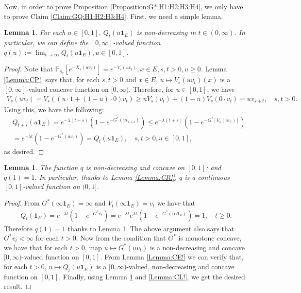 \documentclass[12pt,a4paper]{amsart}
\numberwithin{equation}{section}
\theoremstyle{plain}
\newtheorem{lem}[thm]{Lemma}
\theoremstyle{definition}
\theoremstyle{remark}
\begin{document}
Now, in order to prove Proposition \ref{Proposition:G*:H1:H2:H3:H4}, we only have to prove Claim \ref{Claim:GQ:H1:H2:H3:H4}.
First, we need a simple lemma.
\begin{lem} \label{Lemma:QM!}
For each $u \in [0,1]$, $Q_t(u\mathbf 1_E)$ is non-decreasing in $t\in (0,\infty)$.
In particular, we can define the $[0,\infty]$-valued function $q(u):= \lim_{t\to \infty} Q_t(u\mathbf 1_E), u\in [0,1]$.
\end{lem}
\begin{proof}
Note that $\mathbb P_{\delta_x}[e^{- X_s(uv_t)}] = e^{-V_s(uv_t)},x\in E, s,t>0, u \geq 0$.
Lemma \ref{Lemma:CP!} says that, for each $s,t > 0$ and $x\in E$, $u\mapsto V_s(uv_t)(x) $ is a $[0,\infty]$-valued concave function on $[0,\infty)$.
Therefore, for $u\in [0,1]$,  we have
\begin{align}
 V_s(uv_t)
   =V_s((u\cdot 1 + (1-u) \cdot 0)v_t)
   \geq uV_s(v_t) + (1-u) V_s(0\cdot v_t)
   = uv_{s+t},
   \quad s,t > 0.
 \end{align}
Using this, we have the following:
\begin{align}
  & Q_{t+s}(u\mathbf 1_E)
 = e^{- \lambda (t+s)} ( 1-e^{-G^*(uv_{t+s})} )
 \leq e^{- \lambda(t+s)}( 1-e^{-G^*[V_s(uv_t)]} ) \\
 & = e^{-\lambda t}( 1-e^{-G^*(uv_t)} )
     = Q_t(u\mathbf 1_E),
 \quad s,t > 0, u \in [0,1],
 \end{align}
as desired.
\end{proof}
\begin{lem} \label{Lemma:qC!}
The function $q$ is non-decreasing and concave on $[0,1]$; and $q(1) = 1$.
In particular, thanks to Lemma \ref{Lemma:CR!}, $q$ is a continuous $[0,1]$-valued function on $(0,1]$.
\end{lem}
\begin{proof}
From $G^*(\infty \mathbf 1_E) = \infty$ and $V_t(\infty \mathbf 1_E) = v_t$ we have that
\begin{align}
Q_t(\mathbf 1_E)
= e^{- \lambda t} ( 1-e^{-G^*v_t} )
= e^{- \lambda t} e^{\lambda t}( 1-e^{-G^*(\infty\mathbf 1_E)} )
= 1,
\quad t\geq 0.\end{align}
Therefore $q(1) = 1$ thanks to Lemma \ref{Lemma:QM!}.
The above argument also says that $G^*v_t < \infty$ for each $t>0$.
Now from the condition that $G^*$ is monotone concave, we have that for each $t>0$, map $u \mapsto G^*(uv_t)$ is a non-decreasing and concave $[0,\infty)$-valued function on $[0,1]$.
From Lemma \ref{Lemma:CE!} we can verify that, for each $t> 0$, $u \mapsto Q_t(u \mathbf 1_E)$ is a $[0,\infty)$-valued, non-decreasing and concave function on $[0,1]$.
Finally, using Lemma \ref{Lemma:QM!} and \ref{Lemma:CL!}, we get the desired result.
\end{proof}
\end{document}
